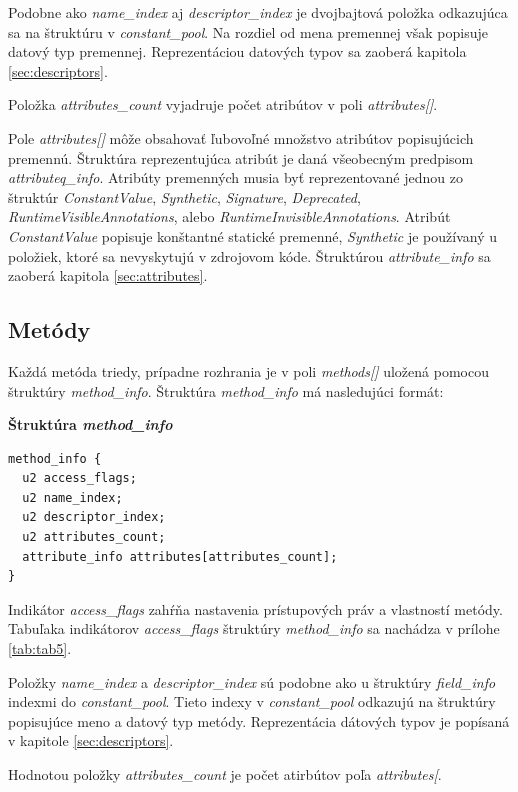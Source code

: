 \documentclass[11pt,final,oneside]{fithesis}
\newenvironment{example}[1]
{
\vspace{3mm}
\noindent\textbf{#1}
\vspace{2mm}
}
{
\vspace{3mm}
}
\begin{document}
Podobne ako \textit{name\_index} aj \textit{descriptor\_index} je dvojbajtová
položka odkazujúca sa na štruktúru v \textit{constant\_pool}. Na rozdiel od
mena premennej však popisuje datový typ premennej. Reprezentáciou datových
typov sa zaoberá kapitola \ref{sec:descriptors}.

Položka \textit{attributes\_count} vyjadruje počet atribútov v poli
\textit{attributes[]}.

Pole \textit{attributes[]} môže obsahovať ľubovoľné množstvo atribútov
popisujúcich premennú. Štruktúra reprezentujúca atribút je daná všeobecným
predpisom \textit{attributeq\_info}. Atribúty premenných musia byť
reprezentované jednou zo štruktúr \textit{ConstantValue}, \textit{Synthetic},
\textit{Signature}, \textit{Deprecated}, \textit{RuntimeVisibleAnnotations},
alebo \textit{RuntimeInvisibleAnnotations}. Atribút \textit{ConstantValue}
popisuje konštantné statické premenné, \textit{Synthetic} je používaný u
položiek, ktoré sa nevyskytujú v zdrojovom kóde. Štruktúrou
\textit{attribute\_info} sa zaoberá kapitola \ref{sec:attributes}.

\subsection{Metódy}
\label{sec:methods}
Každá metóda triedy, prípadne rozhrania je v poli \textit{methods[]} uložená
pomocou štruktúry \textit{method\_info}. Štruktúra \textit{method\_info} má
nasledujúci formát:

\begin{example}{Štruktúra \textit{method\_info}}
\begin{verbatim}
method_info {
  u2 access_flags;
  u2 name_index;
  u2 descriptor_index;
  u2 attributes_count;
  attribute_info attributes[attributes_count];
}
\end{verbatim}
\end{example}

Indikátor \textit{access\_flags} zahŕňa nastavenia prístupových práv a
vlastností metódy. Tabuľaka indikátorov \textit{access\_flags} štruktúry
\textit{method\_info} sa nachádza v prílohe \ref{tab:tab5}.

Položky \textit{name\_index} a \textit{descriptor\_index} sú podobne ako u
štruktúry \textit{field\_info} indexmi do \textit{constant\_pool}. Tieto indexy
v \textit{constant\_pool} odkazujú na štruktúry popisujúce meno a datový typ
metódy. Reprezentácia dátových typov je popísaná v kapitole
\ref{sec:descriptors}.

Hodnotou položky \textit{attributes\_count} je počet atirbútov
poľa \textit{attributes[}.
\end{document}
